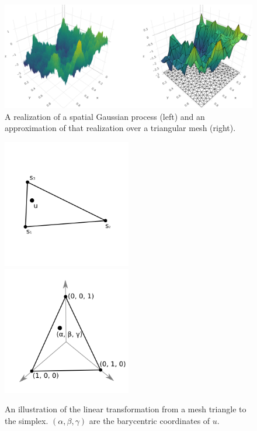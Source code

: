 \documentclass[]{interact}
\begin{document}

\begin{figure}[p]
\includegraphics[width=\textwidth]{figures/surface.png}
\caption{A realization of a spatial Gaussian process (left) and an
approximation of that realization over a triangular mesh (right).}
\label{surface}
\end{figure}

\begin{figure}[p]
\includegraphics[width=0.5\textwidth]{figures/triangle.png}
\includegraphics[width=0.5\textwidth]{figures/simplex.png}
\caption{An illustration of the linear transformation from a mesh triangle to
the simplex. \((\alpha, \beta, \gamma)\) are the barycentric coordinates of
\(u\).}
\label{triangle}
\end{figure}
\end{document}
